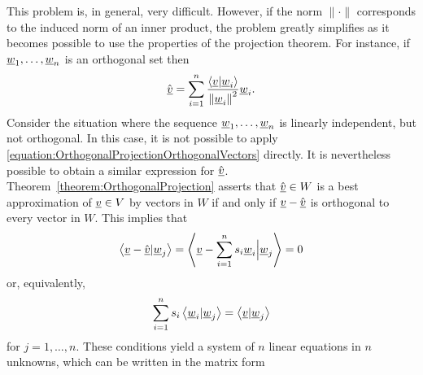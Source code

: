 This problem is, in general, very difficult.
However, if the norm $\| \cdot \|$ corresponds to the induced norm of an inner product, the problem greatly simplifies as it becomes possible to use the properties of the projection theorem.
For instance, if $\underline{w}_1, \ldots, \underline{w}_n$ is an orthogonal set then
\begin{equation} \label{equation:OrthogonalProjectionOrthogonalVectors}
\hat{\underline{v}} = \sum_{i=1}^n \frac{ \left\langle \underline{v} | \underline{w}_i \right\rangle }{ \left\| \underline{w}_i \right\|^2 } \underline{w}_i.
\end{equation}
Consider the situation where the sequence $\underline{w}_1, \ldots, \underline{w}_n$ is linearly independent, but not orthogonal.
In this case, it is not possible to apply \eqref{equation:OrthogonalProjectionOrthogonalVectors} directly.
It is nevertheless possible to obtain a similar expression for $\hat{\underline{v}}$.
Theorem~\ref{theorem:OrthogonalProjection} asserts that $\hat{\underline{v}} \in W$ is a best approximation of $\underline{v} \in V$ by vectors in $W$ if and only if $\underline{v} - \hat{\underline{v}}$ is orthogonal to every vector in $W$.
This implies that
\begin{equation*}
\left\langle \underline{v} - \hat{\underline{v}} | \underline{w}_j \right\rangle
= \left\langle \underline{v} - \sum_{i=1}^n s_i \underline{w}_i \Big| \underline{w}_j \right\rangle
= 0
\end{equation*}
or, equivalently,
\begin{equation*}
\sum_{i=1}^n s_i \left\langle \underline{w}_i | \underline{w}_j \right\rangle
= \left\langle \underline{v} | \underline{w}_j \right\rangle
\end{equation*}
for $j = 1, \ldots, n$.
These conditions yield a system of $n$ linear equations in $n$ unknowns, which can be written in the matrix form
